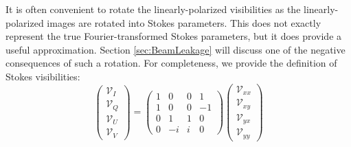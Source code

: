 It is often convenient to rotate the linearly-polarized visibilities as the linearly-polarized
images are rotated into Stokes parameters. This does not exactly represent the true
Fourier-transformed Stokes parameters, but it does provide a useful approximation. Section
\ref{sec:BeamLeakage} will discuss one of the negative consequences of such a rotation. For
completeness, we provide the definition of Stokes visibilities:
\begin{equation}
  \begin{pmatrix}
    \mathcal{V}_I \\
    \mathcal{V}_Q \\
    \mathcal{V}_U \\
    \mathcal{V}_V
  \end{pmatrix} = \begin{pmatrix}
    1 &  0 & 0 &  1 \\
    1 &  0 & 0 & -1 \\
    0 &  1 & 1 &  0 \\
    0 & -i & i &  0
  \end{pmatrix}\begin{pmatrix}
    \mathcal{V}_{xx} \\
    \mathcal{V}_{xy} \\
    \mathcal{V}_{yx} \\
    \mathcal{V}_{yy}
  \end{pmatrix}
\label{eq:def_stokes_vis}
\end{equation}
